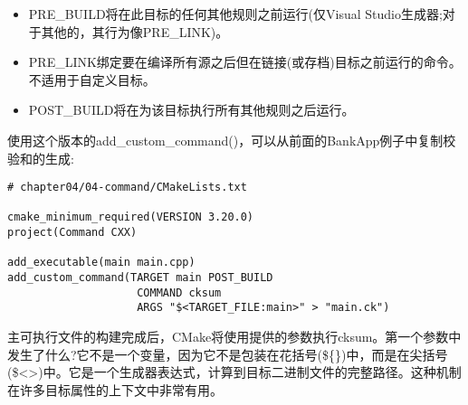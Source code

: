 \begin{itemize}
\item 
PRE\_BUILD将在此目标的任何其他规则之前运行(仅Visual Studio生成器;对于其他的，其行为像PRE\_LINK)。

\item 
PRE\_LINK绑定要在编译所有源之后但在链接(或存档)目标之前运行的命令。不适用于自定义目标。

\item 
POST\_BUILD将在为该目标执行所有其他规则之后运行。
\end{itemize}

使用这个版本的add\_custom\_command()，可以从前面的BankApp例子中复制校验和的生成:

\begin{lstlisting}[style=styleCMake]
# chapter04/04-command/CMakeLists.txt

cmake_minimum_required(VERSION 3.20.0)
project(Command CXX)

add_executable(main main.cpp)
add_custom_command(TARGET main POST_BUILD
					COMMAND cksum
					ARGS "$<TARGET_FILE:main>" > "main.ck")
\end{lstlisting}

主可执行文件的构建完成后，CMake将使用提供的参数执行cksum。第一个参数中发生了什么?它不是一个变量，因为它不是包装在花括号(\$\{\})中，而是在尖括号(\$<>)中。它是一个生成器表达式，计算到目标二进制文件的完整路径。这种机制在许多目标属性的上下文中非常有用。


